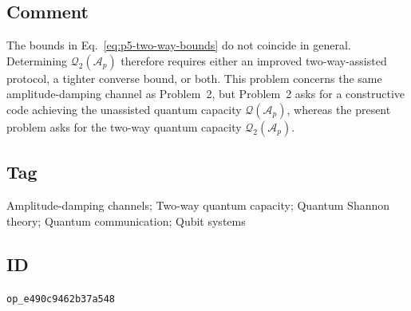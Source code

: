 \subsection*{Comment}

The bounds in Eq.~\eqref{eq:p5-two-way-bounds} do not coincide in general.
Determining $\mathcal{Q}_2(\mathcal A_p)$ therefore requires either an improved
two-way-assisted protocol, a tighter converse bound, or both.
This problem concerns the same amplitude-damping channel as Problem~2, but
Problem~2 asks for a constructive code achieving the unassisted quantum
capacity $\mathcal{Q}(\mathcal A_p)$, whereas the present problem asks for the
two-way quantum capacity $\mathcal{Q}_2(\mathcal A_p)$.

\subsection*{Tag}

Amplitude-damping channels; Two-way quantum capacity; Quantum Shannon theory;
Quantum communication; Qubit systems

\subsection*{ID}

\texttt{op\_e490c9462b37a548}
